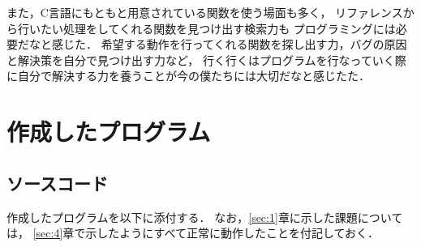 \documentclass[autodetect-engine,dvi=dvipdfmx,ja=standard,
               a4j,11pt]{bxjsarticle}
\begin{document}
また，C言語にもともと用意されている関数を使う場面も多く，
リファレンスから行いたい処理をしてくれる関数を見つけ出す検索力も
プログラミングには必要だなと感じた．
希望する動作を行ってくれる関数を探し出す力，バグの原因と解決策を自分で見つけ出す力など，
行く行くはプログラムを行なっていく際に自分で解決する力を養うことが今の僕たちには大切だなと感じたた．


\section{作成したプログラム} \label{sec:8}

\subsection{ソースコード} \label{sec:8.1}

作成したプログラムを以下に添付する．
なお，\ref{sec:1}章に示した課題については，
\ref{sec:4}章で示したようにすべて正常に動作したことを付記しておく．
\end{document}
